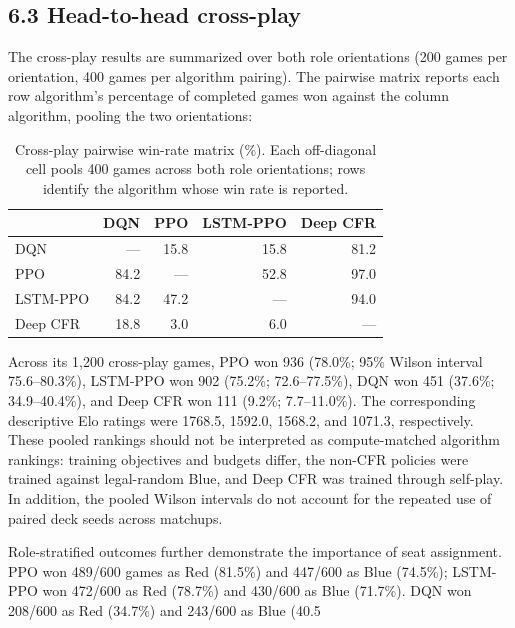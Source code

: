 \documentclass[11pt]{article}
\begin{document}
\subsection*{6.3 Head-to-head cross-play}

The cross-play results are summarized over both role orientations (200 games per orientation, 400 games per algorithm pairing). The pairwise matrix reports each row algorithm's percentage of completed games won against the column algorithm, pooling the two orientations:

\begin{table}[!htbp]
\centering
\small
\renewcommand{\arraystretch}{1.12}
\caption{Cross-play pairwise win-rate matrix (\%). Each off-diagonal cell pools 400 games across both role orientations; rows identify the algorithm whose win rate is reported.}
\label{tab:4}
\begin{tabularx}{0.9\linewidth}{lrrrr}
\toprule
 & \textbf{DQN} & \textbf{PPO} & \textbf{LSTM-PPO} & \textbf{Deep CFR} \\
\midrule
DQN & --- & 15.8 & 15.8 & 81.2 \\
PPO & 84.2 & --- & 52.8 & 97.0 \\
LSTM-PPO & 84.2 & 47.2 & --- & 94.0 \\
Deep CFR & 18.8 & 3.0 & 6.0 & --- \\
\bottomrule
\end{tabularx}
\end{table}

Across its 1,200 cross-play games, PPO won 936 (78.0\%; 95\% Wilson interval 75.6--80.3\%), LSTM-PPO won 902 (75.2\%; 72.6--77.5\%), DQN won 451 (37.6\%; 34.9--40.4\%), and Deep CFR won 111 (9.2\%; 7.7--11.0\%). The corresponding descriptive Elo ratings were 1768.5, 1592.0, 1568.2, and 1071.3, respectively. These pooled rankings should not be interpreted as compute-matched algorithm rankings: training objectives and budgets differ, the non-CFR policies were trained against legal-random Blue, and Deep CFR was trained through self-play. In addition, the pooled Wilson intervals do not account for the repeated use of paired deck seeds across matchups.

Role-stratified outcomes further demonstrate the importance of seat assignment. PPO won 489/600 games as Red (81.5\%) and 447/600 as Blue (74.5\%); LSTM-PPO won 472/600 as Red (78.7\%) and 430/600 as Blue (71.7\%). DQN won 208/600 as Red (34.7\%) and 243/600 as Blue (40.5%
\end{document}
